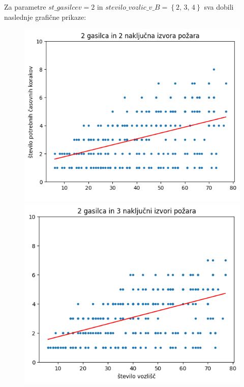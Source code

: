 \documentclass[a4paper, 12pt]{article}
\begin{document}
Za parametre $st\_gasilcev = 2$ in $stevilo\_vozlic\_v\_B = \left\{ 2, \, 3, \, 4 \right\}$ sva dobili
naslednje grafične prikaze:

\begin{figure}[!htb]
      \includegraphics[width=\linewidth]{plot22}
    \endminipage\hfill
      \includegraphics[width=\linewidth]{plot23}
    \endminipage\hfill

\end{figure}
\end{document}
